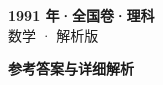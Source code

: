 \documentclass[zihao=-4, a4paper]{ctexart}
\begin{document}
\begin{center}
  {\Large\bfseries 1991 年·全国卷·理科}\\[4pt]
  {\large 数学 · 解析版}
\end{center}
\medskip
{}

\clearpage
{}
\begin{center}{\Large\bfseries 参考答案与详细解析}\end{center}
\medskip

\end{document}
